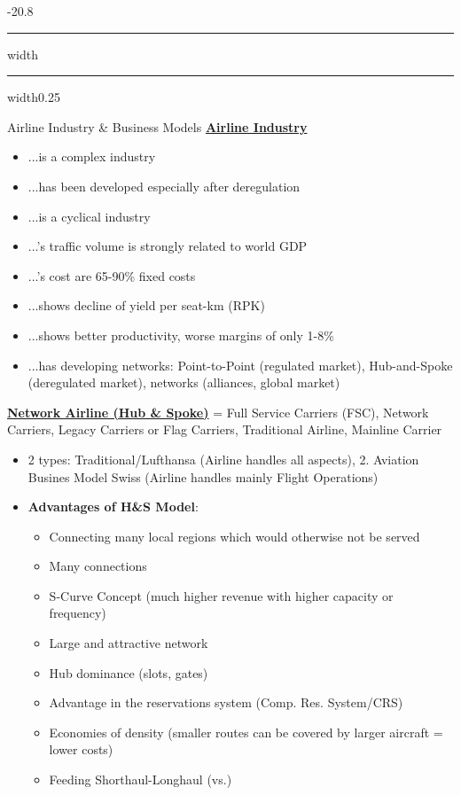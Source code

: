 \documentclass[9pt, landscape, fleqn]{scrartcl}
\makeatletter
\renewcommand{\section}{\@startsection{section}{1}{0mm}%
{-2\baselineskip}{0.8\baselineskip}%
{\hrule depth 0.2pt width\columnwidth\hrule depth1.5pt
width0.25\columnwidth\vspace*{1.2em}\Large\bfseries\rmfamily}}
\makeatother
\begin{document}
\begin{multicols*}{3}
\section{Airline Industry \& Business Models}
\underline{\textbf{Airline Industry}}
\begin{itemize}
    \item ...is a complex industry 
    \item ...has been developed especially after deregulation 
    \item ...is a cyclical industry 
    \item ...'s traffic volume is strongly related to world GDP 
    \item ...'s cost are 65-90\% fixed costs 
    \item ...shows decline of yield per seat-km (RPK)
    \item ...shows better productivity, worse margins of only 1-8\%
    \item ...has developing networks: Point-to-Point (regulated market), Hub-and-Spoke (deregulated market), networks (alliances, global market)
\end{itemize}
\underline{\textbf{Network Airline (Hub \& Spoke)}} = Full Service Carriers (FSC), Network Carriers, Legacy Carriers or Flag Carriers, Traditional Airline, Mainline Carrier
\begin{itemize}
    \item 2 types: Traditional/Lufthansa (Airline handles all aspects), 2. Aviation Busines Model Swiss (Airline handles mainly Flight Operations)
    \item \textbf{Advantages of H\&S Model}:
    \begin{itemize}
        \item Connecting many local regions which would otherwise not be served
        \item Many connections
        \item S-Curve Concept (much higher revenue with higher capacity or frequency)
        \item Large and attractive network
        \item Hub dominance (slots, gates)
        \item Advantage in the reservations
        system (Comp. Res. System/CRS)
        \item Economies of density (smaller routes can be covered by larger aircraft = lower costs)
        \item Feeding Shorthaul-Longhaul (vs.)
    \end{itemize}

\end{itemize}
\end{multicols*}
\end{document}
